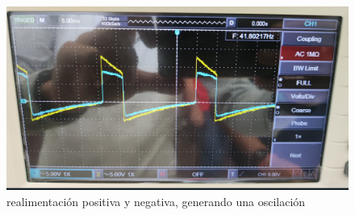 \begin{enumerate}
        \begin{figure}[H]
          \centering
          \renewcommand{\figurename}{Imagen}
          \includegraphics[width=\textwidth]{Imagenes/realimentacionpositiva.png}
          \caption{realimentación positiva y negativa, generando una oscilación}
          \label{fig:realimentacionpositiva}
        \end{figure}

\end{enumerate}


\newpage